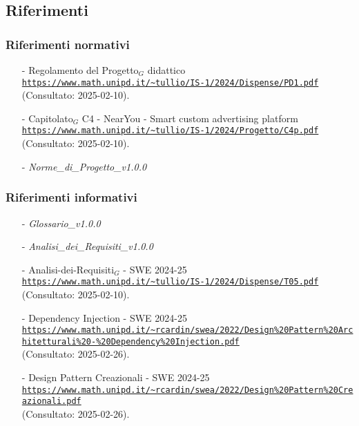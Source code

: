 \documentclass[10pt]{article}
\begin{document}
\begin{justify}
\subsection{Riferimenti}
\subsubsection{Riferimenti normativi}
\begin{itemize}
    \item[-] Regolamento del Progetto$_G$ didattico  \\
    \textcolor{blue}{\texttt{\url{https://www.math.unipd.it/~tullio/IS-1/2024/Dispense/PD1.pdf}}}\\ (Consultato: 2025-02-10).
    \item[-] Capitolato$_G$ C4 - NearYou - Smart custom advertising platform\\
    \textcolor{blue}{\texttt{\url{https://www.math.unipd.it/~tullio/IS-1/2024/Progetto/C4p.pdf}}}\\ (Consultato: 2025-02-10).
    \item[-] \textit{Norme\_di\_Progetto\_v1.0.0}
\end{itemize}

\subsubsection{Riferimenti informativi}
\begin{itemize}
    \item[-] \textit{Glossario\_v1.0.0}
    \item[-] \textit{Analisi\_dei\_Requisiti\_v1.0.0}
    \item[-] Analisi-dei-Requisiti$_G$ - SWE 2024-25\\
    \textcolor{blue}{\texttt{\url{https://www.math.unipd.it/~tullio/IS-1/2024/Dispense/T05.pdf}}}\\ (Consultato: 2025-02-10).
    
    \item[-] Dependency Injection - SWE 2024-25\\    
    \textcolor{blue}{\texttt{\url{https://www.math.unipd.it/~rcardin/swea/2022/Design%20Pattern%20Architetturali%20-%20Dependency%20Injection.pdf}}}\\ (Consultato: 2025-02-26).
    
    \item[-] Design Pattern Creazionali - SWE 2024-25\\
    \textcolor{blue}{\texttt{\url{https://www.math.unipd.it/~rcardin/swea/2022/Design%20Pattern%20Creazionali.pdf}}}\\ (Consultato: 2025-02-26).


\end{itemize}
\end{justify}
\end{document}
